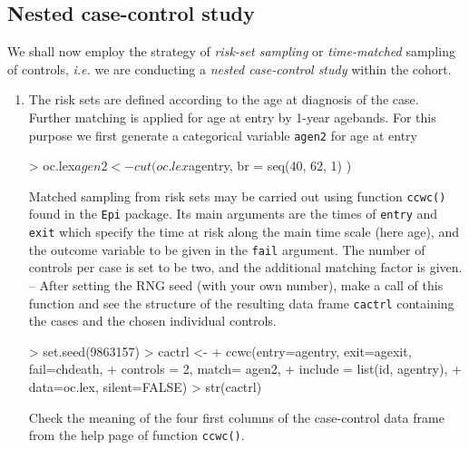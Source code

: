 \subsection{Nested case-control study}

We shall now employ the strategy of {\it risk-set sampling}
or {\it time-matched} sampling of controls, {\it i.e.}
we are conducting a {\it nested case-control study}
within the cohort.

\begin{enumerate}[resume]
\item
The risk sets are defined according to the age at diagnosis of the case. Further matching is applied for age at entry by 1-year agebands.
For this purpose we first generate a categorical variable
{\tt agen2} for age at entry 
\begin{Schunk}
\begin{Sinput}
> oc.lex$agen2 <- cut(oc.lex$agentry, br = seq(40, 62, 1) )
\end{Sinput}
\end{Schunk}

Matched sampling from risk sets may be carried out using 
function {\tt ccwc()} found in the {\tt Epi} package.
Its main arguments are the times 
of {\tt entry} and {\tt exit} which specify the time at risk along the
main time scale (here age), and the outcome variable to be given 
in the {\tt fail} argument. The number of controls per case
is set to be two, and the additional matching factor is given. 
-- After setting the RNG seed (with your own number), 
make a call of this function and see
the structure of the resulting data frame {\tt cactrl} 
containing the cases and the chosen individual controls. 
\begin{Schunk}
\begin{Sinput}
> set.seed(9863157)
> cactrl <- 
+    ccwc(entry=agentry, exit=agexit, fail=chdeath, 
+         controls = 2, match= agen2, 
+         include = list(id, agentry), 
+         data=oc.lex, silent=FALSE)
> str(cactrl)
\end{Sinput}
\end{Schunk}
Check the meaning of the four first columns of the case-control 
data frame from the help page of function {\tt ccwc()}.


\end{enumerate}

